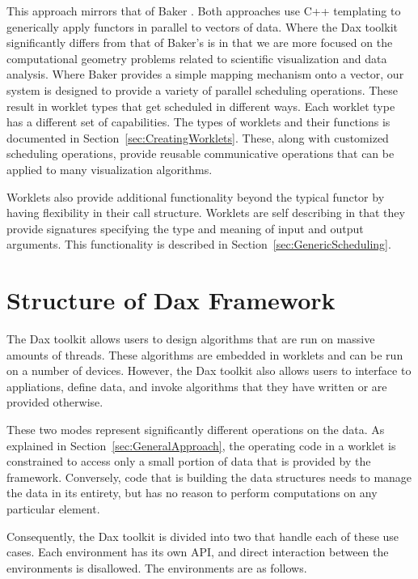 This approach mirrors that of Baker \etal{}.  Both
approaches use C++ templating to generically apply functors in parallel to
vectors of data.  Where the Dax toolkit significantly differs from that of
Baker's is in that we are more focused on the computational geometry
problems related to scientific visualization and data analysis. Where Baker
provides a simple mapping mechanism onto a vector, our system is designed
to provide a variety of parallel scheduling operations.  These result in
worklet types that get scheduled in different ways.  Each worklet type has
a different set of capabilities. The types of worklets and their functions
is documented in Section~\ref{sec:CreatingWorklets}. These, along with
customized scheduling operations, provide reusable communicative operations
that can be applied to many visualization algorithms.

Worklets also provide additional functionality beyond the typical functor
by having flexibility in their call structure. Worklets are self describing
in that they provide signatures  specifying the type and
meaning of input and output arguments. This functionality is described in
Section~\ref{sec:GenericScheduling}.


\section{Structure of Dax Framework}
\label{sec:StructureOfDaxFramework}

The Dax toolkit allows users to design algorithms that are run on massive
amounts of threads. These algorithms are embedded in worklets
 and can be run on a number of devices. However, the Dax
toolkit also allows users to interface to appliations, define data, and
invoke algorithms that they have written or are provided otherwise.

These two modes represent significantly different operations on the
data. As explained in Section~\ref{sec:GeneralApproach}, the operating code
in a worklet is constrained to access only a small portion of data that is
provided by the framework. Conversely, code that is building the data
structures needs to manage the data in its entirety, but has no reason to
perform computations on any particular element.

Consequently, the Dax toolkit is divided into two 
 that handle each of these use cases. Each environment
has its own API, and direct interaction between the environments is
disallowed. The environments are as follows.

